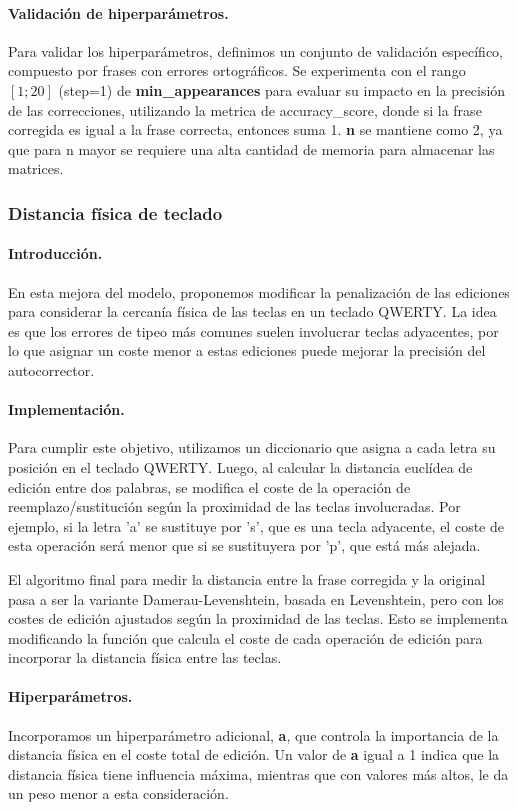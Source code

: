 \documentclass[12pt,a4paper]{article}
\begin{document}
\paragraph{Validación de hiperparámetros.}
Para validar los hiperparámetros, definimos un conjunto de validación específico, compuesto por frases con errores ortográficos. Se experimenta con el rango $[1;20]$ (step=1) de \textbf{min\_appearances} para evaluar su impacto en la precisión de las correcciones, utilizando la metrica de accuracy\_score, donde si la frase corregida es igual a la frase correcta, entonces suma 1. \textbf{n} se mantiene como 2, ya que para n mayor se requiere una alta cantidad de memoria para almacenar las matrices.



\subsubsection{Distancia física de teclado}
\paragraph{Introducción.}
En esta mejora del modelo, proponemos modificar la penalización de las ediciones para considerar la cercanía física de las teclas en un teclado QWERTY. La idea es que los errores de tipeo más comunes suelen involucrar teclas adyacentes, por lo que asignar un coste menor a estas ediciones puede mejorar la precisión del autocorrector.
\paragraph{Implementación.}
Para cumplir este objetivo, utilizamos un diccionario que asigna a cada letra su posición en el teclado QWERTY. Luego, al calcular la distancia euclídea de edición entre dos palabras, se modifica el coste de la operación de reemplazo/sustitución según la proximidad de las teclas involucradas. Por ejemplo, si la letra 'a' se sustituye por 's', que es una tecla adyacente, el coste de esta operación será menor que si se sustituyera por 'p', que está más alejada.

El algoritmo final para medir la distancia entre la frase corregida y la original pasa a ser la variante Damerau-Levenshtein, basada en Levenshtein, pero con los costes de edición ajustados según la proximidad de las teclas. Esto se implementa modificando la función que calcula el coste de cada operación de edición para incorporar la distancia física entre las teclas.
\paragraph{Hiperparámetros.}
Incorporamos un hiperparámetro adicional, \textbf{a}, que controla la importancia de la distancia física en el coste total de edición. Un valor de \textbf{a} igual a 1 indica que la distancia física tiene influencia máxima, mientras que con valores más altos, le da un peso menor a esta consideración.
\end{document}
